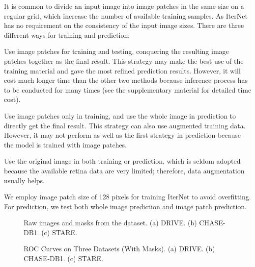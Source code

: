 \documentclass[10pt,twocolumn,letterpaper]{article}
\begin{document}
It is common to divide an input image into image patches in the same size on a regular grid, which increase the number of available training samples. As IterNet has no requirement on the consistency of the input image sizes. There are three different ways for training and prediction: 
\begin{compactitem}
    \item Use image patches for training and testing, conquering the resulting image patches together as the final result. This strategy may make the best use of the training material and gave the most refined prediction results. However, it will cost much longer time than the other two methods because inference process has to be conducted for many times (see the supplementary material for detailed time cost).
    \item Use image patches only in training, and use the whole image in prediction to directly get the final result. This strategy can also use augmented training data. However, it may not perform as well as the first strategy in prediction because the model is trained with image patches.
    \item Use the original image in both training or prediction, which is seldom adopted because the available retina data are very limited; therefore, data augmentation usually helps.
\end{compactitem}
We employ image patch size of 128 pixels for training IterNet to avoid overfitting. For prediction, we test both whole image prediction and image patch prediction.




\begin{figure}[!t]
	\setlength{\fboxsep}{0pt}\setlength{\fboxrule}{0.2pt}

	\centering
	\hfil
	\hfil
	\hfil
	\caption{Raw images and masks from the dataset. (a) DRIVE. (b) CHASE-DB1. (c) STARE. }
	\label{fig_mask}
\end{figure}

\begin{figure*}[!t]
	\setlength{\fboxsep}{0pt}\setlength{\fboxrule}{0.2pt}

	\centering
	\hfil
	\hfil
	\caption{ROC Curves on Three Datasets (With Masks). (a) DRIVE. (b) CHASE-DB1. (c) STARE.}
	\label{fig_auc}
\end{figure*}
\end{document}
